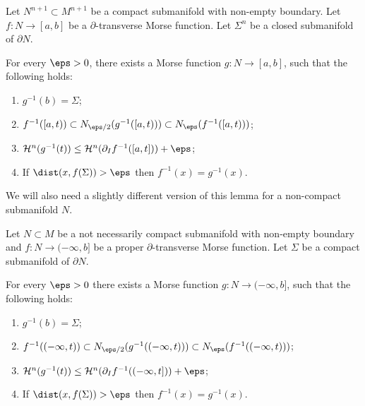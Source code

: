 \begin{lemma}\label{lem:morse-foliation-1}
    Let $N^{n + 1} \subset M^{n + 1}$ be a compact submanifold with non-empty boundary. Let $f: N \to [a, b]$ be a $\partial$-transverse Morse function. Let $\Sigma^n$ be a closed submanifold of $\partial N$.

    For every $\eps > 0$, there exists a Morse function $g: N \to [a, b]$, such that the following holds:
    \begin{enumerate}
        \item[(1)] $g^{-1}(b) = \Sigma$;
        \item[(2)] $f^{-1}([a, t)) \subset N_{\eps/2}(g^{-1}([a, t))) \subset N_\eps(f^{-1}([a, t)))$;
        \item[(3)] $\mathcal{H}^n(g^{-1}(t)) \leq \mathcal{H}^n(\partial_I f^{-1}([a, t])) + \eps$;
        \item[(4)] If $\dist(x, f(\Sigma)) > \eps$ then $f^{-1}(x) = g^{-1}(x)$.
    \end{enumerate}
\end{lemma}
We will also need a slightly different version of this lemma for a non-compact submanifold $N$.
\begin{lemma}\label{lem:morse-foliation-non-compact}
    Let $N \subset M$ be a not necessarily compact submanifold with non-empty boundary and $f: N \to (-\infty, b]$ be a proper $\partial$-transverse Morse function. Let $\Sigma$ be a compact submanifold of $\partial N$.

    For every $\eps > 0$ there exists a Morse function $g: N \to (-\infty, b]$, such that the following holds:
    \begin{enumerate}
        \item[(1)] $g^{-1}(b) = \Sigma$;
        \item[(2)] $f^{-1}((-\infty, t)) \subset N_{\eps/2}(g^{-1}((-\infty, t))) \subset N_\eps(f^{-1}((-\infty, t)))$;
        \item[(3)] $\mathcal{H}^n(g^{-1}(t)) \leq \mathcal{H}^n(\partial_I f^{-1}((-\infty, t])) + \eps$;
        \item[(4)] If $\dist(x, f(\Sigma)) > \eps$ then $f^{-1}(x) = g^{-1}(x)$.
    \end{enumerate}
\end{lemma}
